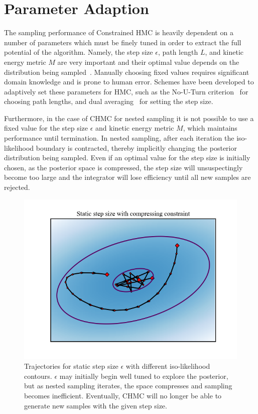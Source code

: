 \documentclass[11pt]{article}
\begin{document}
\section{Parameter Adaption}\label{param_adaption}
    The sampling performance of Constrained HMC is heavily dependent on a number of parameters which must be finely
    tuned in order to extract the full potential of the algorithm.
    Namely, the step size $\epsilon$, path length $L$, and kinetic energy metric $M$ are very important and their
    optimal value depends on the distribution being sampled~\cite{MCMChamiltonian}.
    Manually choosing fixed values requires significant domain knowledge and is prone to human error.
    Schemes have been developed to adaptively set these parameters for HMC, such as the No-U-Turn
    criterion~\cite{hoffman2011nouturn} for choosing path lengths, and dual averaging~\cite{nesterov_dual_averaging}
    for setting the step size.

    Furthermore, in the case of CHMC for nested sampling it is not possible to use a fixed value for the
    step size $\epsilon$ and kinetic energy metric $M$, which maintains performance until termination.
    In nested sampling, after each iteration the iso-likelihood boundary is contracted, thereby implicitly changing the
    posterior distribution being sampled.
    Even if an optimal value for the step size is initially chosen, as the posterior space is compressed, the step size
    will unsuspectingly become too large and the integrator will lose efficiency until all new samples are rejected.

    \begin{figure}[t!]
        \center
        \includegraphics[width=\linewidth]{../figures/StaticStepSize}
        \caption{
            Trajectories for static step size $\epsilon$ with different iso-likelihood contours.
            $\epsilon$ may initially begin well tuned to explore the posterior, but as nested sampling iterates,
            the space compresses and sampling becomes inefficient.
            Eventually, CHMC will no longer be able to generate new samples with the given step size.
        }\label{fig:static_step_size}
    \end{figure}
\end{document}
